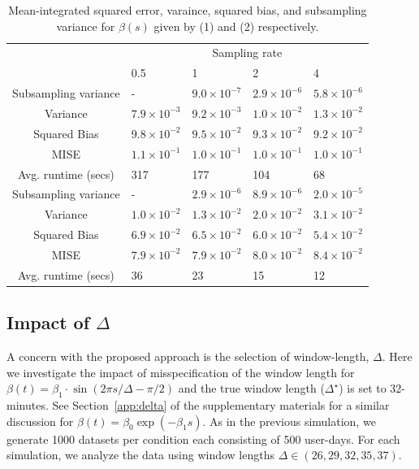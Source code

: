 \documentclass[12pt]{amsart}
\begin{document}
\begin{table}[!th]
\begin{tabular}{c | p{2cm} p{2cm} p{2cm} p{2cm}}
& \multicolumn{4}{c}{Sampling rate} \\ \cline{2-5}
 & 0.5 & 1 & 2 & 4 \\ \hline
Subsampling variance & - & $9.0 \times 10^{-7}$ & $2.9 \times 10^{-6}$ & $5.8 \times 10^{-6}$  \\
Variance & $7.9 \times 10^{-3}$ & $9.2 \times 10^{-3}$ & $1.0 \times 10^{-2}$ & $1.3 \times 10^{-2}$ \\
Squared Bias & $9.8 \times 10^{-2}$ & $9.5 \times 10^{-2}$ & $9.3 \times 10^{-2}$ & $9.2 \times 10^{-2}$   \\
MISE & $1.1 \times 10^{-1}$ & $1.0 \times 10^{-1}$ & $1.0 \times 10^{-1}$ & $1.0 \times 10^{-1}$ \\ \hline
Avg. runtime (secs) & 317 & 177 & 104 & 68 \\ \hline
Subsampling variance & - & $2.9 \times 10^{-6}$ & $8.9 \times 10^{-6}$ & $2.0 \times 10^{-5}$  \\
Variance & $1.0 \times 10^{-2}$ & $1.3 \times 10^{-2}$ & $2.0 \times 10^{-2}$ & $3.1 \times 10^{-2}$ \\
Squared Bias & $6.9 \times 10^{-2}$ & $6.5 \times 10^{-2}$ & $6.0 \times 10^{-2}$ & $5.4 \times 10^{-2}$   \\
MISE & $7.9 \times 10^{-2}$ & $7.9 \times 10^{-2}$ & $8.0 \times 10^{-2}$ & $8.4 \times 10^{-2}$ \\ \hline
Avg. runtime (secs) & 36 & 23 & 15 & 12 \\ \hline
\end{tabular}
\caption{Mean-integrated squared error, varaince, squared bias, and subsampling variance for $\beta(s)$ given by (1) and (2) respectively.}
\label{tab:mise}
\end{table}

\subsection{Impact of $\Delta$}

A concern with the proposed approach is the selection of window-length, $\Delta$.  Here we investigate the impact of misspecification of the window length for $\beta(t) = \beta_1 \cdot \sin \left( 2 \pi s / \Delta - \pi /2 \right)$ and the true window length ($\Delta^\star$) is set to 32-minutes.  See Section~\ref{app:delta} of the supplementary materials for a similar discussion for $\beta(t) = \beta_0 \exp \left( - \beta_1 s \right)$.  As in the previous simulation, we generate 1000 datasets per condition each consisting of 500 user-days.  For each simulation, we analyze the data using window lengths $\Delta \in (26,29,32,35,37)$.
\end{document}
